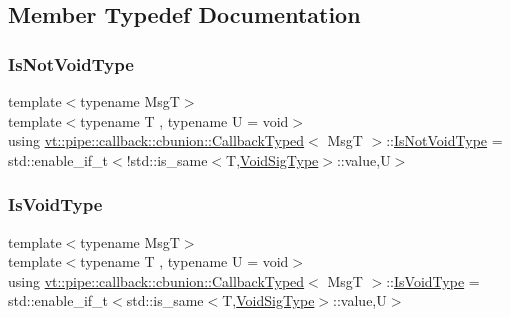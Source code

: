 \subsection{Member Typedef Documentation}
\mbox{\label{structvt_1_1pipe_1_1callback_1_1cbunion_1_1_callback_typed_a57e15e61b171c50bff2e7a0dd9078f46}} 
\subsubsection{\texorpdfstring{Is\+Not\+Void\+Type}{IsNotVoidType}}
{\footnotesize\ttfamily template$<$typename MsgT$>$ \\
template$<$typename T , typename U  = void$>$ \\
using \hyperlink{structvt_1_1pipe_1_1callback_1_1cbunion_1_1_callback_typed}{vt\+::pipe\+::callback\+::cbunion\+::\+Callback\+Typed}$<$ MsgT $>$\+::\hyperlink{structvt_1_1pipe_1_1callback_1_1cbunion_1_1_callback_typed_a57e15e61b171c50bff2e7a0dd9078f46}{Is\+Not\+Void\+Type} =  std\+::enable\+\_\+if\+\_\+t$<$!std\+::is\+\_\+same$<$T,\hyperlink{structvt_1_1pipe_1_1callback_1_1cbunion_1_1_callback_typed_afeaa5f774eee46269e64e566b8239c22}{Void\+Sig\+Type}$>$\+::value,U$>$}

\mbox{\label{structvt_1_1pipe_1_1callback_1_1cbunion_1_1_callback_typed_aa23761e1f62f24201d28eed0e85322ac}} 
\subsubsection{\texorpdfstring{Is\+Void\+Type}{IsVoidType}}
{\footnotesize\ttfamily template$<$typename MsgT$>$ \\
template$<$typename T , typename U  = void$>$ \\
using \hyperlink{structvt_1_1pipe_1_1callback_1_1cbunion_1_1_callback_typed}{vt\+::pipe\+::callback\+::cbunion\+::\+Callback\+Typed}$<$ MsgT $>$\+::\hyperlink{structvt_1_1pipe_1_1callback_1_1cbunion_1_1_callback_typed_aa23761e1f62f24201d28eed0e85322ac}{Is\+Void\+Type} =  std\+::enable\+\_\+if\+\_\+t$<$std\+::is\+\_\+same$<$T,\hyperlink{structvt_1_1pipe_1_1callback_1_1cbunion_1_1_callback_typed_afeaa5f774eee46269e64e566b8239c22}{Void\+Sig\+Type}$>$\+::value,U$>$}

